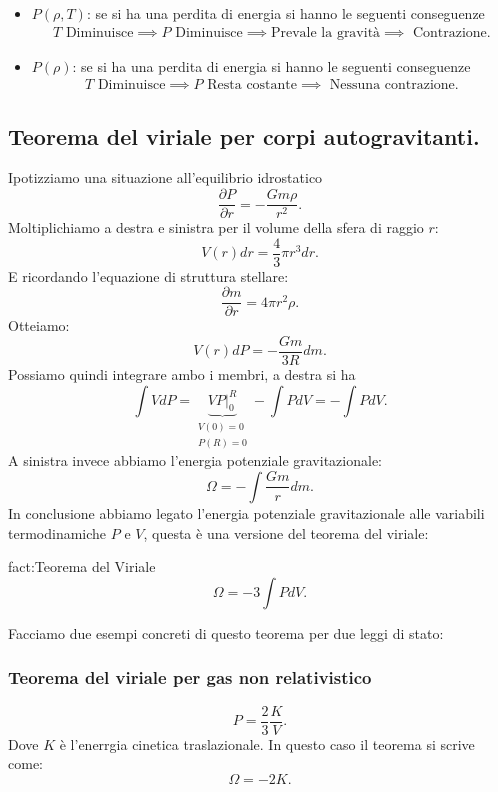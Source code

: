 \begin{itemize}
	\item $P(\rho ,T)$: se si ha una perdita di energia si hanno le seguenti conseguenze
		\[\begin{aligned}
			T \text{ Diminuisce} \implies 
			P \text{ Diminuisce} \implies
			\text{Prevale la gravità} \implies
			\text{ Contrazione}
		.\end{aligned}\]
	\item $P(\rho )$: se si ha una perdita di energia si hanno le seguenti conseguenze
		\[\begin{aligned}
			T \text{ Diminuisce} \implies 
			P \text{ Resta costante} \implies
			\text{ Nessuna contrazione}
		.\end{aligned}\]
\end{itemize}

\subsection{Teorema del viriale per corpi autogravitanti.}
\label{subsec:Teorema del viriale per corpi autogravitanti.}
Ipotizziamo una situazione all'equilibrio idrostatico
\[
	\frac{\partial P}{\partial r} 
	=
	-\frac{Gm\rho }{r^2}
.\] 
Moltiplichiamo a destra e sinistra per il volume della sfera di raggio $r$:
\[
	V(r)dr=\frac{4}{3}\pi r^3dr
.\] 
E ricordando l'equazione di struttura stellare:
\[
	\frac{\partial m}{\partial r} = 4\pi r^2 \rho 
.\] 
Otteiamo:
\[
	V(r)dP = -\frac{Gm}{3R}dm
.\]
Possiamo quindi integrare ambo i membri, a destra si ha
\[
	\int VdP = \underbrace{\left.VP\right|_{0}^R}_{\substack{V(0)=0	\\ P(R)=0 }} - \int PdV =  -\int PdV
.\]
A sinistra invece abbiamo l'energia potenziale gravitazionale:
\[
	\Omega  = - \int \frac{Gm}{r}d m
.\] 
In conclusione abbiamo legato l'energia potenziale gravitazionale alle variabili termodinamiche $P$ e $V$, questa è una versione del teorema del viriale:
\begin{fact}{fact:Teorema del Viriale}
	\[
		\Omega  = -3 \int PdV
	.\] 
\end{fact}
Facciamo due esempi concreti di questo teorema per due leggi di stato:
\subsubsection{Teorema del viriale per gas non relativistico}
\label{subsubsec:Teorema del viriale per gas non relativistico}
\[
	P = \frac{2}{3}\frac{K}{V}
.\] 
Dove $K$ è l'enerrgia cinetica traslazionale. In questo caso il teorema si scrive come:
\[
	\Omega=-2K
.\] 
